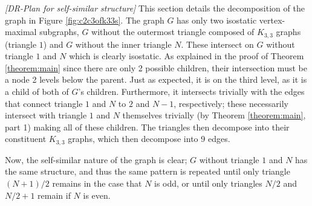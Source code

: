 \myexample
\textsl{[DR-Plan for self-similar structure]}
This section details the decomposition of the graph in Figure \ref{fig:c2c3ofk33s}. The graph $G$ has only two isostatic vertex-maximal subgraphs, $G$ without the outermost triangle composed of $K_{3,3}$ graphs (triangle $1$) and $G$ without the inner triangle $N$. These intersect on $G$ without triangle $1$ and $N$ which is clearly isostatic. As explained in the proof of Theorem \ref{theorem:main} since there are only 2 possible children, their intersection must be a node 2 levels below the parent. Just as expected, it is on the third level, as it is a child of both of $G$'s children. Furthermore, it intersects trivially with the edges that connect triangle $1$ and $N$ to $2$ and $N-1$, respectively; these necessarily intersect with triangle $1$ and $N$ themselves trivially (by Theorem \ref{theorem:main}, part 1) making all of these children. The triangles then decompose into their constituent $K_{3,3}$ graphs, which then decompose into 9 edges.

Now, the self-similar nature of the graph is clear; $G$ without triangle $1$ and $N$ has the same structure, and thus the same pattern is repeated until only triangle $(N+1)/2$ remains in the case that $N$ is odd, or until only triangles $N/2$ and $N/2+1$ remain if $N$ is even.












